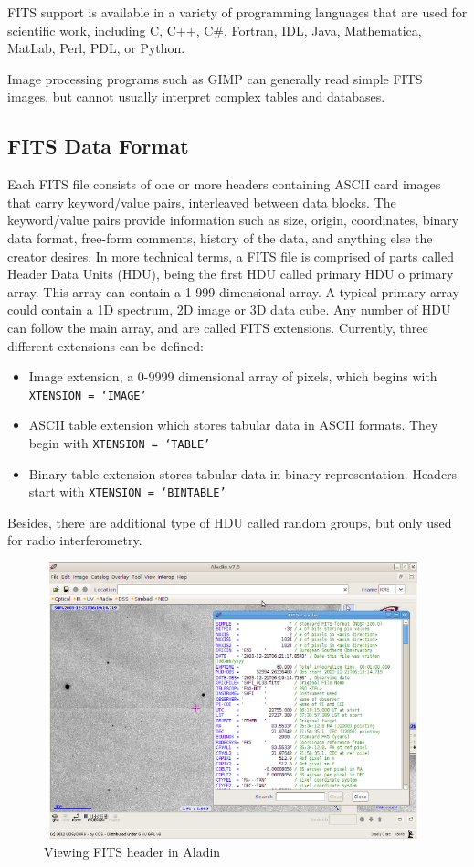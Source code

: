 FITS support is available in a variety of programming languages that are used for scientific work, including C, C++, C\#, Fortran, IDL, Java, Mathematica, MatLab, Perl, PDL, or Python. 
 
Image processing programs such as GIMP can generally read simple FITS images, but cannot usually interpret complex tables and databases.

\subsection{FITS Data Format}

Each FITS file consists of one or more headers containing ASCII card images that carry keyword/value pairs, interleaved between data blocks. The keyword/value pairs provide information such as size, origin, coordinates, binary data format, free-form comments, history of the data, and anything else the creator desires. In more technical terms, a FITS file is comprised of parts called Header Data Units (HDU), being the first HDU called primary HDU o primary array. This array can contain a 1-999 dimensional array. A typical primary array could contain a 1D spectrum, 2D image or 3D data cube. Any number of HDU can follow the main array, and are called FITS extensions. Currently, three different extensions can be defined:

\begin{itemize}
\item Image extension, a 0-9999 dimensional array of pixels, which begins with \texttt{XTENSION = `IMAGE'}
\item ASCII table extension which stores tabular data in ASCII formats. They begin with \texttt{XTENSION = `TABLE'}
\item Binary table extension stores tabular data in binary representation. Headers start with \texttt{XTENSION = `BINTABLE'}
\end{itemize}

Besides, there are additional type of HDU called random groups, but only used for radio interferometry.
      
\begin{figure}[tb]
\centering
\includegraphics[width=11cm,height=8cm]{images/fits_header.png}
\caption{Viewing FITS header in Aladin}
\end{figure}


